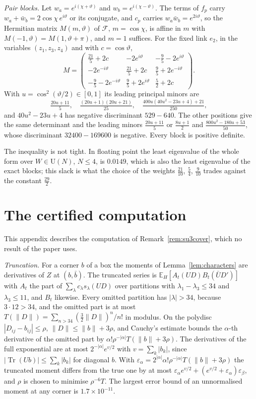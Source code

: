 \documentclass[aps,prd,twocolumn,superscriptaddress,nofootinbib,longbibliography,floatfix,amsmath,amssymb,10pt]{revtex4-2}
\theoremstyle{definition}
\theoremstyle{remark}
\newcommand{\E}{\mathbb{E}}
\newcommand{\U}{\mathrm{U}}
\newcommand{\Tr}{\operatorname{Tr}}
\begin{document}
\emph{Pair blocks.} Let $w_a=e^{i(\chi+\vartheta)}$ and $w_b=e^{i(\chi-\vartheta)}$.
The terms of $f_p$ carry $w_a+\bar w_b=2\cos\chi\,e^{i\vartheta}$ or its
conjugate, and $c_p$ carries $w_a\bar w_b=e^{2i\vartheta}$, so the Hermitian
matrix $M(m,\vartheta)$ of $\mathcal F$, $m=\cos\chi$, is affine in $m$ with
$M(-1,\vartheta)=M(1,\vartheta+\pi)$, and $m=1$ suffices. For the fixed link
$e_2$, in the variables $(z_1,z_3,z_4)$ and with $c=\cos\vartheta$,
\[
M=\begin{pmatrix}\frac{21}5+2c&-2e^{i\vartheta}&-\frac95-2e^{i\vartheta}\\[2pt]
-2e^{-i\vartheta}&\frac{21}5+2c&\frac95+2e^{-i\vartheta}\\[2pt]
-\frac95-2e^{-i\vartheta}&\frac95+2e^{i\vartheta}&\frac52+2c\end{pmatrix}.
\]
With $u=\cos^2(\vartheta/2)\in[0,1]$ its leading principal minors are
\[
\tfrac{20u+11}5,\quad\tfrac{(20u+1)(20u+21)}{25},\quad
\tfrac{400u(40u^2-23u+4)+21}{250},
\]
and $40u^2-23u+4$ has negative discriminant $529-640$. The other positions
give the same determinant and the leading minors $\frac{20u+11}5$ or
$\frac{8u+1}2$ and $\frac{800u^2-180u+53}{50}$, whose discriminant $32400-169600$
is negative. Every block is positive definite.

The inequality is not tight. In floating point the least eigenvalue of the
whole form over $W\in\U(N)$, $N\le4$, is $0.0149$, which is also the least
eigenvalue of the exact blocks; this slack is what the choice of the weights
$\frac{21}{10}$, $\frac54$, $\frac9{10}$ trades against the constant
$\frac{29}2$.

\section{The certified computation}\label{app:cover}

This appendix describes the computation of Remark~\ref{rem:su3cover}, which
no result of the paper uses.


\emph{Truncation.} For a corner $b$ of a box the moments of
Lemma~\ref{lem:characters} are derivatives of $Z$ at $(b,\bar b)$. The
truncated series is $\E_H[A_t(UD)B_t(\bar UD')]$ with $A_t$ the part of
$\sum_\lambda c_\lambda s_\lambda(UD)$ over partitions with $\lambda_1-\lambda_3\le34$ and
$\lambda_3\le11$, and $B_t$ likewise. Every omitted partition has $|\lambda|>34$,
because $3\cdot12>34$, and the omitted part is at most $T(\|D\|)=\sum_{n>34}
(\frac32\|D\|)^n/n!$ in modulus. On the polydisc $|D_{ij}-b_{ij}|\le\rho$,
$\|D\|\le\|b\|+3\rho$, and Cauchy's estimate bounds the $\alpha$-th derivative
of the omitted part by $\alpha!\rho^{-|\alpha|}T(\|b\|+3\rho)$. The
derivatives of the full exponential are at most $2^{-|\alpha|}e^{v/2}$ with
$v=\sum_k|b_k|$, since $|\Tr(Ub)|\le\sum_k|b_k|$ for diagonal $b$. With
$\varepsilon_\alpha=2^{|\alpha|}\alpha!\rho^{-|\alpha|}T(\|b\|+3\rho)$ the
truncated moment differs from the true one by at most $\varepsilon_\alpha e^{v/2}
+(e^{v/2}+\varepsilon_\alpha)\varepsilon_\beta$, and $\rho$ is chosen to minimise
$\rho^{-6}T$. The largest error bound of an unnormalised moment at any corner is
$1.7\times10^{-11}$.
\end{document}
